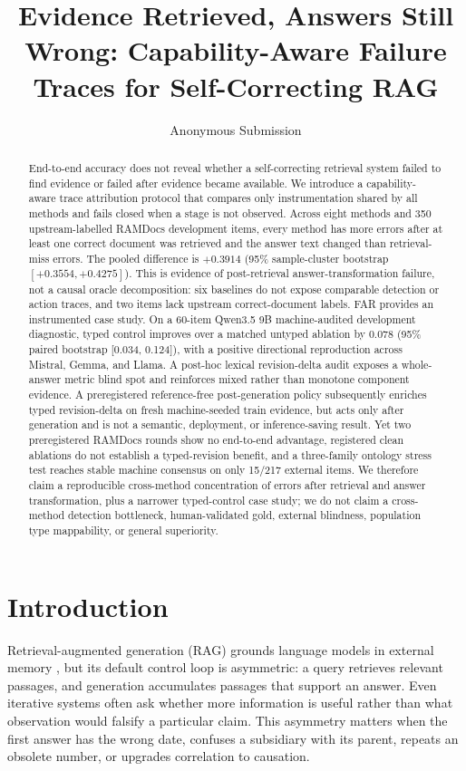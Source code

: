 \documentclass[letterpaper]{article}
\title{Evidence Retrieved, Answers Still Wrong: Capability-Aware Failure Traces for Self-Correcting RAG}
\author{Anonymous Submission}
\begin{document}
\maketitle

\begin{abstract}
End-to-end accuracy does not reveal whether a self-correcting retrieval system failed to find evidence or failed after evidence became available. We introduce a capability-aware trace attribution protocol that compares only instrumentation shared by all methods and fails closed when a stage is not observed. Across eight methods and 350 upstream-labelled RAMDocs development items, every method has more errors after at least one correct document was retrieved and the answer text changed than retrieval-miss errors. The pooled difference is $+0.3914$ (95\% sample-cluster bootstrap $[+0.3554,+0.4275]$). This is evidence of post-retrieval answer-transformation failure, not a causal oracle decomposition: six baselines do not expose comparable detection or action traces, and two items lack upstream correct-document labels. FAR provides an instrumented case study. On a 60-item Qwen3.5 9B machine-audited development diagnostic, typed control improves over a matched untyped ablation by 0.078 (95\% paired bootstrap [0.034, 0.124]), with a positive directional reproduction across Mistral, Gemma, and Llama. A post-hoc lexical revision-delta audit exposes a whole-answer metric blind spot and reinforces mixed rather than monotone component evidence. A preregistered reference-free post-generation policy subsequently enriches typed revision-delta on fresh machine-seeded train evidence, but acts only after generation and is not a semantic, deployment, or inference-saving result. Yet two preregistered RAMDocs rounds show no end-to-end advantage, registered clean ablations do not establish a typed-revision benefit, and a three-family ontology stress test reaches stable machine consensus on only 15/217 external items. We therefore claim a reproducible cross-method concentration of errors after retrieval and answer transformation, plus a narrower typed-control case study; we do not claim a cross-method detection bottleneck, human-validated gold, external blindness, population type mappability, or general superiority.
\end{abstract}

\section{Introduction}
Retrieval-augmented generation (RAG) grounds language models in external memory \cite{lewis2020rag}, but its default control loop is asymmetric: a query retrieves relevant passages, and generation accumulates passages that support an answer. Even iterative systems often ask whether more information is useful rather than what observation would falsify a particular claim. This asymmetry matters when the first answer has the wrong date, confuses a subsidiary with its parent, repeats an obsolete number, or upgrades correlation to causation.
\end{document}

